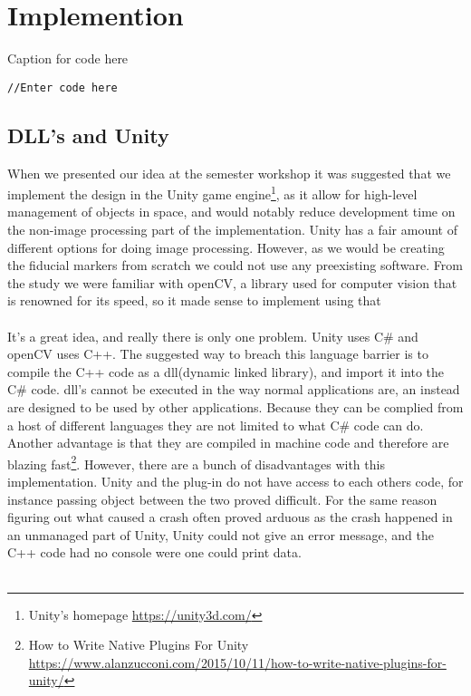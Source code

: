 \chapter{Implemention}
	\begin{listing}[H]
		\caption{Caption for code here}
		\label{listing:kernels}
		\begin{verbatim}
//Enter code here
		\end{verbatim}
	\end{listing}

\section{DLL's and Unity}
When we presented our idea at the semester workshop it was suggested that we implement the design in the Unity game engine\footnote{Unity's homepage \url{https://unity3d.com/}}, as it allow for high-level management of objects in space, and would notably reduce development time on the non-image processing part of the implementation. Unity has a fair amount of different options for doing image processing. However, as we would be creating the fiducial markers from scratch we could not use any preexisting software. From the study we were familiar with openCV, a library used for computer vision that is renowned for its speed, so it made sense to implement using that\\\\
It's a great idea, and really there is only one problem. Unity uses C\# and openCV uses C++. The suggested way to breach this language barrier is to compile the C++ code as a dll(dynamic linked library), and import it into the C\# code. dll's  cannot be executed in the way normal applications are, an instead are designed to be used by other applications. Because they can be complied from a host of different languages they are not limited to what C\# code can do. Another advantage is that they are compiled in machine code and therefore are blazing fast\footnote{How to Write Native Plugins For Unity \url{https://www.alanzucconi.com/2015/10/11/how-to-write-native-plugins-for-unity/}}. However, there are a bunch of disadvantages with this implementation. Unity and the plug-in do not have access to each others code, for instance passing object between the two proved difficult. For the same reason figuring out what caused a crash often proved arduous as the crash happened in an unmanaged part of Unity, Unity could not give an error message, and the C++ code had no console were one could print data.\\\\
